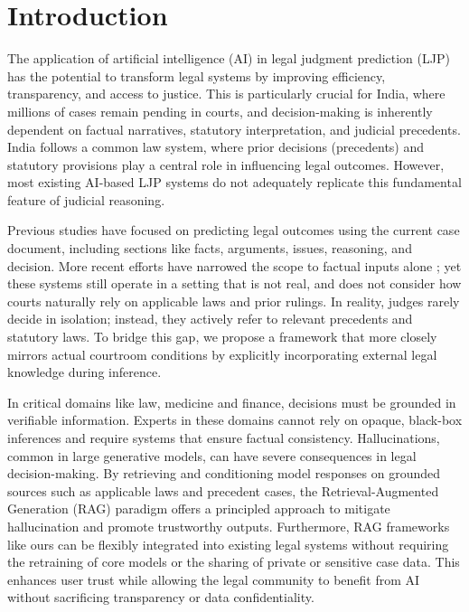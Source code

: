 \section{Introduction}
The application of artificial intelligence (AI) in legal judgment prediction (LJP) has the potential to transform legal systems by improving efficiency, transparency, and access to justice. This is particularly crucial for India, where millions of cases remain pending in courts, and decision-making is inherently dependent on factual narratives, statutory interpretation, and judicial precedents. India follows a common law system, where prior decisions (precedents) and statutory provisions play a central role in influencing legal outcomes. However, most existing AI-based LJP systems do not adequately replicate this fundamental feature of judicial reasoning.

Previous studies \citep{malik-etal-2021-ildc, nigam-etal-2024-legal, nigam-etal-2025-nyayaanumana} have focused on predicting legal outcomes using the current case document, including sections like facts, arguments, issues, reasoning, and decision. More recent efforts have narrowed the scope to factual inputs alone \citep{nigam-etal-2024-rethinking, FactLegalLlama}; yet these systems still operate in a setting that is not real, and does not consider how courts naturally rely on applicable laws and prior rulings. In reality, judges rarely decide in isolation; instead, they actively refer to relevant precedents and statutory laws. To bridge this gap, we propose a framework that more closely mirrors actual courtroom conditions by explicitly incorporating external legal knowledge during inference.

In critical domains like law, medicine and finance, decisions must be grounded in verifiable information. Experts in these domains cannot rely on opaque, black-box inferences and require systems that ensure factual consistency. Hallucinations, common in large generative models, can have severe consequences in legal decision-making. By retrieving and conditioning model responses on grounded sources such as applicable laws and precedent cases, the Retrieval-Augmented Generation (RAG) paradigm offers a principled approach to mitigate hallucination and promote trustworthy outputs. Furthermore, RAG frameworks like ours can be flexibly integrated into existing legal systems without requiring the retraining of core models or the sharing of private or sensitive case data. This enhances user trust while allowing the legal community to benefit from AI without sacrificing transparency or data confidentiality.


